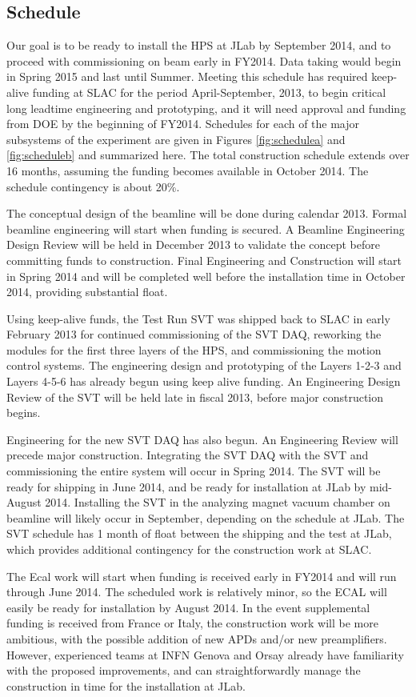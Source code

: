 \subsection{Schedule}
Our goal is to be ready to install the HPS at JLab by September 2014, and to proceed with commissioning on beam early in FY2014. Data taking 
would begin in Spring 2015 and last until Summer. Meeting this schedule has required keep-alive funding at SLAC for the period April-September, 2013, 
to begin critical long leadtime engineering and prototyping, and it will need  approval and funding from DOE by the beginning of FY2014. Schedules 
for each of the major subsystems of the experiment are given in Figures \ref{fig:schedulea} and \ref{fig:scheduleb} and summarized here. The total construction schedule extends over 16 months, 
assuming the funding becomes available in October 2014. The schedule contingency is about 20\%.
 
The conceptual design of the beamline will be done during calendar 2013. Formal beamline engineering will start when funding is secured. A Beamline Engineering 
Design Review will be held in December 2013 to validate the concept before committing funds to construction. 
Final Engineering and Construction will start in Spring 2014 and will be completed well before the installation time in October 2014, providing substantial float. 

Using keep-alive funds, the Test Run SVT was shipped back to SLAC in early February 2013 for continued commissioning of the SVT DAQ, reworking the 
modules for the first three layers of the HPS, and commissioning the motion control systems. The engineering design and prototyping of the Layers 1-2-3 and 
Layers 4-5-6 has already begun using keep alive funding. An Engineering Design Review of the SVT will be held late in fiscal 2013, before major construction
begins. 

Engineering for the new SVT DAQ has also begun. An Engineering Review will precede major construction.  Integrating the SVT DAQ with the SVT and commissioning the
entire system will occur in Spring 2014. The SVT will be ready for shipping in June 2014, and be ready for installation at JLab by mid-August 2014.  Installing 
the SVT in the analyzing magnet vacuum chamber on beamline will likely occur in September, depending on the schedule at JLab.  The SVT schedule has 1 month of 
float between the shipping and the test at JLab, which provides additional contingency for the construction work at SLAC.

The Ecal work will start when funding is received early in FY2014 and will run through June 2014. The scheduled work is relatively minor, so the ECAL will 
easily be ready for installation by August 2014. In the event supplemental funding is received from France or Italy, the construction work will be more ambitious, 
with the possible addition of new APDs and/or new preamplifiers. However, experienced teams at INFN Genova and Orsay already have familiarity with the proposed
improvements, and can straightforwardly manage the construction in time for the installation at JLab.

